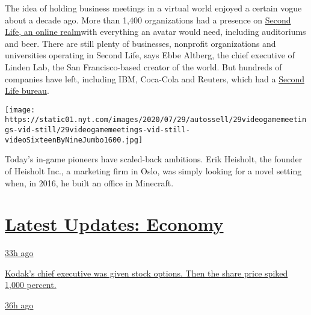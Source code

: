 The idea of holding business meetings in a virtual world enjoyed a
certain vogue about a decade ago. More than 1,400 organizations had a
presence on
\href{https://www.nytimes.com/2006/10/19/technology/19virtual.html}{Second
Life, an online realm}with everything an avatar would need, including
auditoriums and beer. There are still plenty of businesses, nonprofit
organizations and universities operating in Second Life, says Ebbe
Altberg, the chief executive of Linden Lab, the San Francisco-based
creator of the world. But hundreds of companies have left, including
IBM, Coca-Cola and Reuters, which had a
\href{https://www.nytimes.com/2006/10/16/technology/16reuters.html}{Second
Life bureau}.

\texttt{[image: https://static01.nyt.com/images/2020/07/29/autossell/29videogamemeetings-vid-still/29videogamemeetings-vid-still-videoSixteenByNineJumbo1600.jpg]}

Today's in-game pioneers have scaled-back ambitions. Erik Heisholt, the
founder of Heisholt Inc., a marketing firm in Oslo, was simply looking
for a novel setting when, in 2016, he built an office in Minecraft.

\hypertarget{latest-updates-economy}{%
\section{\texorpdfstring{\href{https://www.nytimes.com/live/2020/07/31/business/stock-market-today-coronavirus?action=click\&pgtype=Article\&state=default\&region=MAIN_CONTENT_1\&context=storylines_live_updates}{Latest
Updates:
Economy}}{Latest Updates: Economy}}\label{latest-updates-economy}}

\href{https://www.nytimes.com/live/2020/07/31/business/stock-market-today-coronavirus?action=click\&pgtype=Article\&state=default\&region=MAIN_CONTENT_1\&context=storylines_live_updates\#kodaks-chief-executive-was-given-stock-options-then-the-share-price-spiked-1000-percent}{33h
ago}

\href{https://www.nytimes.com/live/2020/07/31/business/stock-market-today-coronavirus?action=click\&pgtype=Article\&state=default\&region=MAIN_CONTENT_1\&context=storylines_live_updates\#kodaks-chief-executive-was-given-stock-options-then-the-share-price-spiked-1000-percent}{Kodak's
chief executive was given stock options. Then the share price spiked
1,000 percent.}

\href{https://www.nytimes.com/live/2020/07/31/business/stock-market-today-coronavirus?action=click\&pgtype=Article\&state=default\&region=MAIN_CONTENT_1\&context=storylines_live_updates\#fitch-ratings-downgrades-its-outlook-on-us-debt}{36h
ago}

